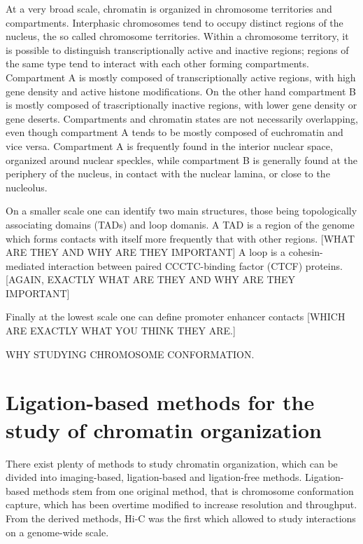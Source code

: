 At a very broad scale, chromatin is organized in chromosome territories and compartments. Interphasic chromosomes tend to occupy distinct regions of the nucleus, the so called chromosome territories. Within a chromosome territory, it is possible to distinguish transcriptionally active and inactive regions; regions of the same type tend to interact with each other forming compartments. Compartment A is mostly composed of transcriptionally active regions, with high gene density and active histone modifications. On the other hand compartment B is mostly composed of trascriptionally inactive regions, with lower gene density or gene deserts. Compartments and chromatin states are not necessarily overlapping, even though compartment A tends to be mostly composed of euchromatin and vice versa. Compartment A is frequently found in the interior nuclear space, organized around nuclear speckles, while compartment B is generally found at the periphery of the nucleus, in contact with the nuclear lamina, or close to the nucleolus.

On a smaller scale one can identify two main structures, those being topologically associating domains (TADs) and loop domanis. A TAD is a region of the genome which forms contacts with itself more frequently that with other regions. [WHAT ARE THEY AND WHY ARE THEY IMPORTANT] A loop is a cohesin-mediated interaction between paired CCCTC-binding factor (CTCF) proteins. [AGAIN, EXACTLY WHAT ARE THEY AND WHY ARE THEY IMPORTANT]

Finally at the lowest scale one can define promoter enhancer contacts [WHICH ARE EXACTLY WHAT YOU THINK THEY ARE.]

WHY STUDYING CHROMOSOME CONFORMATION.


\section{Ligation-based methods for the study of chromatin organization}

There exist plenty of methods to study chromatin organization, which can be divided into imaging-based, ligation-based and ligation-free methods. Ligation-based methods stem from one original method, that is chromosome conformation capture, which has been overtime modified to increase resolution and throughput. From the derived methods, Hi-C was the first which allowed to study interactions on a genome-wide scale.

